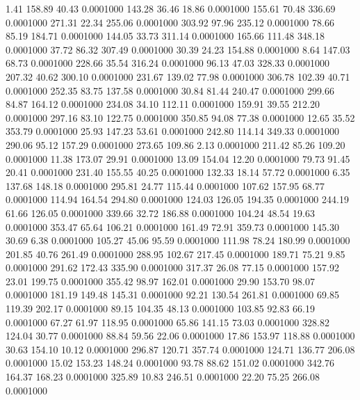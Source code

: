    1.41  158.89   40.43   0.0001000
 143.28   36.46   18.86   0.0001000
 155.61   70.48  336.69   0.0001000
 271.31   22.34  255.06   0.0001000
 303.92   97.96  235.12   0.0001000
  78.66   85.19  184.71   0.0001000
 144.05   33.73  311.14   0.0001000
 165.66  111.48  348.18   0.0001000
  37.72   86.32  307.49   0.0001000
  30.39   24.23  154.88   0.0001000
   8.64  147.03   68.73   0.0001000
 228.66   35.54  316.24   0.0001000
  96.13   47.03  328.33   0.0001000
 207.32   40.62  300.10   0.0001000
 231.67  139.02   77.98   0.0001000
 306.78  102.39   40.71   0.0001000
 252.35   83.75  137.58   0.0001000
  30.84   81.44  240.47   0.0001000
 299.66   84.87  164.12   0.0001000
 234.08   34.10  112.11   0.0001000
 159.91   39.55  212.20   0.0001000
 297.16   83.10  122.75   0.0001000
 350.85   94.08   77.38   0.0001000
  12.65   35.52  353.79   0.0001000
  25.93  147.23   53.61   0.0001000
 242.80  114.14  349.33   0.0001000
 290.06   95.12  157.29   0.0001000
 273.65  109.86    2.13   0.0001000
 211.42   85.26  109.20   0.0001000
  11.38  173.07   29.91   0.0001000
  13.09  154.04   12.20   0.0001000
  79.73   91.45   20.41   0.0001000
 231.40  155.55   40.25   0.0001000
 132.33   18.14   57.72   0.0001000
   6.35  137.68  148.18   0.0001000
 295.81   24.77  115.44   0.0001000
 107.62  157.95   68.77   0.0001000
 114.94  164.54  294.80   0.0001000
 124.03  126.05  194.35   0.0001000
 244.19   61.66  126.05   0.0001000
 339.66   32.72  186.88   0.0001000
 104.24   48.54   19.63   0.0001000
 353.47   65.64  106.21   0.0001000
 161.49   72.91  359.73   0.0001000
 145.30   30.69    6.38   0.0001000
 105.27   45.06   95.59   0.0001000
 111.98   78.24  180.99   0.0001000
 201.85   40.76  261.49   0.0001000
 288.95  102.67  217.45   0.0001000
 189.71   75.21    9.85   0.0001000
 291.62  172.43  335.90   0.0001000
 317.37   26.08   77.15   0.0001000
 157.92   23.01  199.75   0.0001000
 355.42   98.97  162.01   0.0001000
  29.90  153.70   98.07   0.0001000
 181.19  149.48  145.31   0.0001000
  92.21  130.54  261.81   0.0001000
  69.85  119.39  202.17   0.0001000
  89.15  104.35   48.13   0.0001000
 103.85   92.83   66.19   0.0001000
  67.27   61.97  118.95   0.0001000
  65.86  141.15   73.03   0.0001000
 328.82  124.04   30.77   0.0001000
  88.84   59.56   22.06   0.0001000
  17.86  153.97  118.88   0.0001000
  30.63  154.10   10.12   0.0001000
 296.87  120.71  357.74   0.0001000
 124.71  136.77  206.08   0.0001000
  15.02  153.23  148.24   0.0001000
  93.78   88.62  151.02   0.0001000
 342.76  164.37  168.23   0.0001000
 325.89   10.83  246.51   0.0001000
  22.20   75.25  266.08   0.0001000
